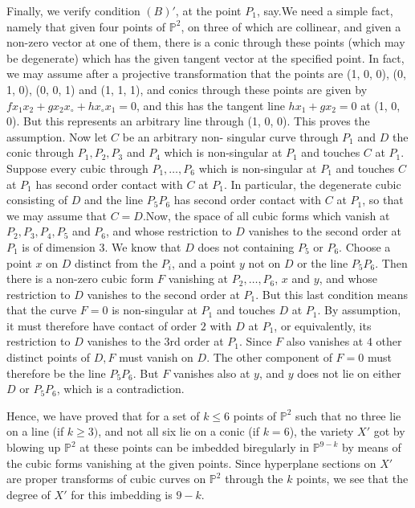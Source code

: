 Finally, we verify condition $(B)'$, at the point $P_1$, say.We need a
simple fact, namely that given four points of $\mathbb{P}^2$, on three
of which are collinear, and given a non-zero vector at one of them,
there is a conic through these points (which may be degenerate) which
has the given tangent vector at the specified point. In fact, we may
assume after a projective transformation that the points are
(1, 0, 0), (0, 1, 0), (0, 0, 1) and (1, 1, 1), and conics through these
points are given by $fx_1x_2 + gx_2x_\circ + hx_\circ x_1 = 0$, and this has
the tangent line $hx_1 + gx_2 =0$ at (1, 0, 0). But this represents an
arbitrary line through (1, 0, 0). This proves the assumption. Now let
$C$ be an arbitrary non- singular curve through $P_1$ and $D$ the
conic through $P_1, P_2, P_3$ and $P_4$ which is non-singular at $P_1$
and touches $C$ at $P_1$. Suppose every cubic through $P_1, \ldots
,P_6$ which is non-singular at $P_1$ and touches $C$ at $P_1$ has
second order contact with $C$ at $P_1$. In particular, the degenerate
cubic consisting of $D$ and the line $P_5 P_6$ has second order
contact with $C$ at $P_1$, so that we may assume that
$C=D$.\pageoriginale Now, the space of all cubic forms which vanish at
$P_2, P_3, P_4, P_5$ and 
$P_6$, and whose restriction to $D$ vanishes to the second order at
$P_1$ is of dimension 3. We know that $D$ does not containing $P_5$ or
$P_6$. Choose a point $x$ on $D$ distinct from the $P_i$, and a point
$y$ not on $D$ or the line $P_5P_6$. Then there is a non-zero cubic
form $F$ vanishing at $P_2 , \ldots,P_6$, $x$ and $y$, and whose
restriction to $D$ vanishes to the second order at $P_1$. But this
last condition means that the curve $F=0$ is non-singular at $P_1$ and
touches $D$ at $P_1$. By assumption, it must therefore have contact
of order $2$ with $D$ at $P_1$, or equivalently, its restriction to
$D$ vanishes to the $3$rd order at $P_1$. Since $F$ also vanishes at
$4$ other distinct points of $D,F$ must vanish on $D$. The other
component of $F=0$ must therefore be the line $P_5 P_6$. But $F$
vanishes also at $y$, and $y$ does not lie on either $D$ or $P_5 P_6$,
which is a contradiction. 

Hence, we have proved that for a set of $k \leq 6$ points of
$\mathbb{P}^2$ such that no three lie on a line (if $k \geq 3)$, and
not all six lie on a conic (if $k= 6$), the variety $X'$ got by
blowing up $\mathbb{P}^2$ at these points can be imbedded biregularly
in $\mathbb{P}^{9-k}$ by means of the cubic forms vanishing at the
given points. Since hyperplane sections on $X'$ are proper transforms
of cubic curves on $\mathbb{P}^2$   through the $k$ points, we see
that the degree of $X'$ for this imbedding is $9-k$. 

